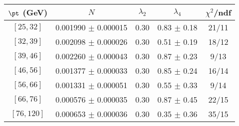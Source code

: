 \begin{tabular}{c||c|c|c|c}
$\pt$ (GeV) & $N$ & $\lambda_{2}$ & $\lambda_4$  & $\chi^2$/ndf  \\
\hline
$[25, 32]$ & 0.001990 $\pm$ 0.000015 & 0.30 & 0.83 $\pm$ 0.18 & 21/11\\
$[32, 39]$ & 0.002098 $\pm$ 0.000026 & 0.30 & 0.51 $\pm$ 0.19 & 18/12\\
$[39, 46]$ & 0.002260 $\pm$ 0.000043 & 0.30 & 0.87 $\pm$ 0.23 & 9/13\\
$[46, 56]$ & 0.001377 $\pm$ 0.000033 & 0.30 & 0.85 $\pm$ 0.24 & 16/14\\
$[56, 66]$ & 0.001331 $\pm$ 0.000051 & 0.30 & 0.55 $\pm$ 0.33 & 9/14\\
$[66, 76]$ & 0.000576 $\pm$ 0.000035 & 0.30 & 0.87 $\pm$ 0.45 & 22/15\\
$[76, 120]$ & 0.000653 $\pm$ 0.000036 & 0.30 & 0.35 $\pm$ 0.36 & 35/15\\
\end{tabular}
